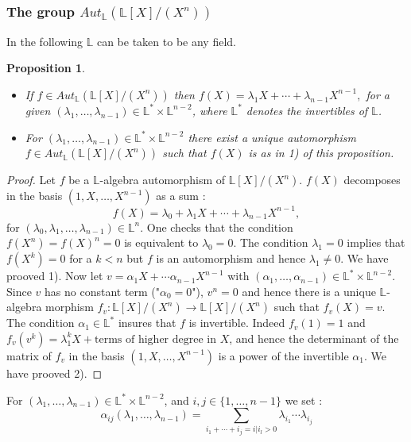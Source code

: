 \documentclass[12pt, reqno]{amsart}
\newtheorem{proposition}[theorem]{Proposition}
\newcommand{\FL}{ {\mathbb L} }
\begin{document}
\subsubsection{The group $Aut_\FL(\FL[X]/(X^n))$}In the following $\FL$ can be taken to be any field.
\begin{proposition}\label{O}
\begin{itemize}
\item[1)] If $f \in Aut_\FL(\FL[X]/(X^n))$ then $f(X)=\lambda_1 X + \cdots + \lambda_{n-1} X^{n-1},$ for a given $(\lambda_1,\dots,\lambda_{n-1}) \in \FL^*\times \FL^{n-2}$, where $\FL^*$ denotes the invertibles of $\FL$.
\item[2)] For $(\lambda_1,\dots,\lambda_{n-1}) \in \FL^*\times \FL^{n-2}$ there exist a unique automorphism  $f \in Aut_\FL(\FL[X]/(X^n))$ such that $f(X)$ is as in 1) of this proposition. 
\end{itemize}
\end{proposition}
\begin{proof}
Let $f$ be a $\FL$-algebra automorphism of $\FL[X]/(X^n)$.  $f(X)$ decomposes in the basis $(1,X,\dots,X^{n-1})$ as a sum :
$$f(X)=\lambda_0 +\lambda_1 X + \cdots + \lambda_{n-1} X^{n-1},$$ for $(\lambda_0, \lambda_1,\dots,\lambda_{n-1}) \in  \FL^n$. One checks that the condition $f(X^n)=f(X)^n=0$ is equivalent to $\lambda_0=0$. The condition $\lambda_1=0$ implies that $f(X^k)=0$ for a $k< n$ but $f$ is an automorphism and hence $\lambda_1\neq 0$. We have prooved 1). Now let $v=\alpha_1 X+ \cdots \alpha_{n-1} X^{n-1}$  with $(\alpha_1,\dots, \alpha_{n-1})\in\FL^* \times \FL^{n-2}$. Since $v$ has no constant term ("$\alpha_0=0$"), $v^n=0$ and hence there is a unique $\FL$-algebra morphism $f_v :  \FL[X]/(X^n) \to \FL[X]/(X^n)$ such that $f_v(X)=v$. The condition $\alpha_1 \in \FL^*$ insures that $f$ is invertible. Indeed $f_v(1)=1$ and $f_v(v^k)=\lambda_1^kX+\text{terms of higher degree in $X$}$, and hence the determinant of the matrix of $f_v$ in the basis $(1,X,\dots,X^{n-1})$ is a power of the invertible $\alpha_1$. We have prooved 2).
\end{proof}

For $(\lambda_1,\dots,\lambda_{n-1}) \in \FL^*\times \FL^{n-2}$, and $i,j\in\{1,\dots,n-1\}$ we set :
\begin{equation}\label{alpha}
\alpha_{ij}(\lambda_1,\dots,\lambda_{n-1})= \underset{i_1+\cdots+ i_j=i \vert i_l >0}{\sum} \lambda_{i_1}\cdots \lambda_{i_j}
\end{equation}
\end{document}
